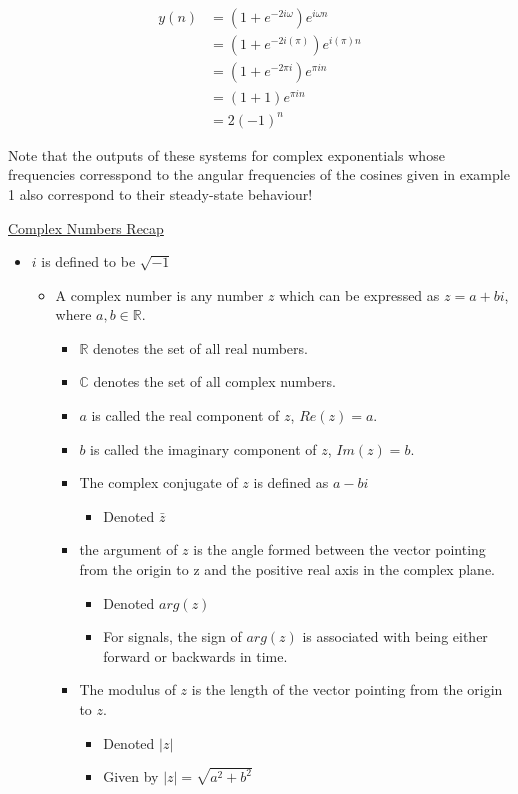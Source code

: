 \documentclass{article}
\begin{document}
\begin{align*}
	y(n) &= (1 + e^{-2i{\omega}})e^{i{\omega}n} \\
	&= (1 + e^{-2i{(\pi)}})e^{i{(\pi)}n} \\
	&= (1 + e^{-2{\pi}i})e^{{\pi}in} \\
	&= (1 + 1)e^{{\pi}in} \\
	&= 2{(-1)}^n
\end{align*}

\vspace{.3cm}

Note that the outputs of these systems for complex exponentials whose frequencies corresspond to the angular frequencies of the cosines given in example 1 also correspond to their steady-state behaviour!

\newpage

\begin{center}
	\Large{\underline{Complex Numbers Recap}}
\end{center}

\begin{itemize}
	\item $i$ is defined to be $\sqrt{-1}$
	\begin{itemize}
		\item A complex number is any number $z$ which can be expressed as $z = a + bi$, where $a, b \in \mathbb{R}$.
		\begin{itemize}
			\item $\mathbb{R}$ denotes the set of all real numbers.
			\item $\mathbb{C}$ denotes the set of all complex numbers.
			\item $a$ is called the real component of $z$, $Re(z) = a$.
			\item $b$ is called the imaginary component of $z$, $Im(z) = b$.
			\item The complex conjugate of $z$ is defined as $a - bi$
			\begin{itemize}
				\item Denoted $\bar{z}$
			\end{itemize}
			\item the argument of $z$ is the angle formed between the vector pointing from the origin to z and the positive real axis in the complex plane.
			\begin{itemize}
				\item Denoted $arg(z)$
				\item For signals, the sign of $arg(z)$ is associated with being either forward or backwards in time.
			\end{itemize}
			\item The modulus of $z$ is the length of the vector pointing from the origin to $z$.
			\begin{itemize}
				\item Denoted $|z|$
				\item Given by $|z| = \sqrt{a^2 + b^2}$
			\end{itemize}
		\end{itemize}
	\end{itemize}
\end{itemize}
\end{document}
